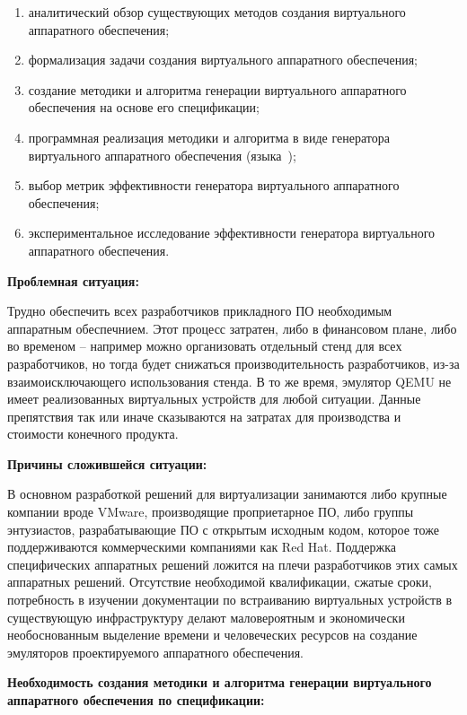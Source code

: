 \begin{enumerate}[label={\arabic*)}]
    \item аналитический обзор существующих методов создания виртуального аппаратного обеспечения;
    \item формализация задачи создания виртуального аппаратного обеспечения;
    \item создание методики и алгоритма генерации виртуального аппаратного обеспечения на основе его спецификации;
    \item программная реализация методики и алгоритма в виде генератора
          виртуального аппаратного обеспечения \mbox{(языка {\mylanguage});}
    \item выбор метрик эффективности генератора виртуального аппаратного обеспечения;
    \item экспериментальное исследование эффективности генератора виртуального аппаратного обеспечения.
\end{enumerate}

\textbf{Проблемная ситуация:}

Трудно обеспечить всех разработчиков прикладного ПО необходимым
аппаратным обеспечнием. Этот процесс затратен, либо в финансовом плане,
либо во временом -- например можно организовать отдельный стенд для
всех разработчиков, но тогда будет снижаться производительность
разработчиков, из-за взаимоисключающего использования стенда.
В то же время, эмулятор QEMU не имеет реализованных виртуальных
устройств для любой ситуации. Данные препятствия так или иначе
сказываются на затратах для производства и стоимости конечного продукта.

\textbf{Причины сложившейся ситуации:}

В основном разработкой решений для виртуализации занимаются либо крупные компании вроде VMware, производящие
проприетарное ПО, либо группы энтузиастов, разрабатывающие ПО с открытым исходным кодом, которое
тоже поддерживаются коммерческими компаниями как Red Hat. Поддержка специфических аппаратных решений
ложится на плечи разработчиков этих самых аппаратных решений. Отсутствие необходимой квалификации,
сжатые сроки, потребность в изучении документации по встраиванию виртуальных устройств в существующую
инфраструктуру делают маловероятным и экономически необоснованным выделение времени и
человеческих ресурсов на создание эмуляторов проектируемого аппаратного обеспечения.

\textbf{Необходимость создания методики и алгоритма генерации виртуального аппаратного
обеспечения по спецификации:}

